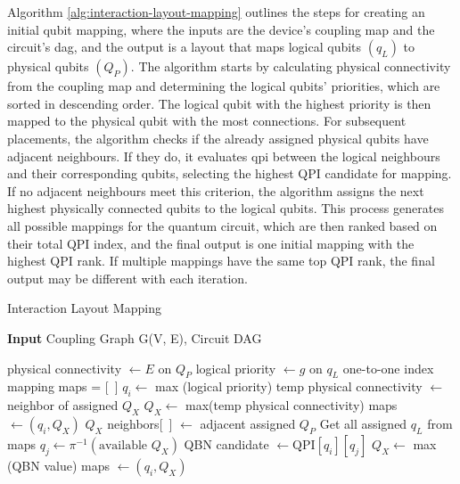 Algorithm \ref{alg:interaction-layout-mapping}  outlines the steps for creating an initial qubit mapping, where the inputs are the device's coupling map and the circuit's \acrfull{dag}, and the output is a layout that maps logical qubits $(q_L)$ to physical qubits $(Q_P)$. The algorithm starts by calculating physical connectivity from the coupling map and determining the logical qubits' priorities, which are sorted in descending order. The logical qubit with the highest priority is then mapped to the physical qubit with the most connections. For subsequent placements, the algorithm checks if the already assigned physical qubits have adjacent neighbours. If they do, it evaluates \acrfull{qpi} between the logical neighbours and their corresponding qubits, selecting the highest QPI candidate for mapping. If no adjacent neighbours meet this criterion, the algorithm assigns the next highest physically connected qubits to the logical qubits. This process generates all possible mappings for the quantum circuit, which are then ranked based on their total QPI index, and the final output is one initial mapping with the highest QPI rank. If multiple mappings have the same top QPI rank, the final output may be different with each iteration.

\begin{algorithm}[htb]
\caption{Interaction Layout Mapping}\label{alg:interaction-layout-mapping}
\hspace*{\algorithmicindent} \textbf{Input} Coupling Graph G(V, E), Circuit DAG \\
\begin{algorithmic}[1]
\State physical connectivity $\gets E$ on $Q_P$
\State logical priority $\gets g$ on $q_L$
\State \Return one-to-one index mapping
\EndIf
\State maps = [\ ]
        \State $q_i \gets$ max (logical priority)
        \State temp physical connectivity $\gets$ neighbor of assigned $Q_X$
            \State $Q_X \gets$ max(temp physical connectivity)
            \State maps $\gets (q_i, Q_X)$
        \Else
            \State $Q_X$ neighbors[\ ] $\gets$ adjacent assigned $Q_P$
            \State Get all assigned $q_L$ from maps
                \State $q_j \gets \pi^{-1}(\text{available }Q_X)$
                \State QBN candidate $\gets \text{QPI}[q_i][q_j]$
            \EndFor
            \State $Q_X \gets$ max (QBN value)
            \State maps $\gets (q_i, Q_X)$
        \EndIf
    \EndFor
\EndWhile
\end{algorithmic}
\end{algorithm}

